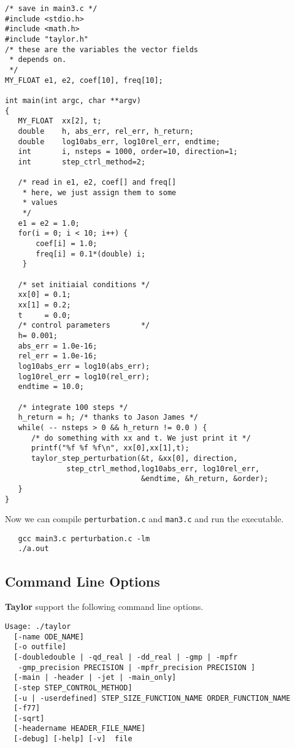 \documentclass{article}
\begin{document}
\begin{verbatim}
/* save in main3.c */
#include <stdio.h>
#include <math.h>
#include "taylor.h"
/* these are the variables the vector fields 
 * depends on.
 */
MY_FLOAT e1, e2, coef[10], freq[10];

int main(int argc, char **argv)
{
   MY_FLOAT  xx[2], t;
   double    h, abs_err, rel_err, h_return;
   double    log10abs_err, log10rel_err, endtime;
   int       i, nsteps = 1000, order=10, direction=1;
   int       step_ctrl_method=2;

   /* read in e1, e2, coef[] and freq[] 
    * here, we just assign them to some
    * values 
    */
   e1 = e2 = 1.0;
   for(i = 0; i < 10; i++) { 
       coef[i] = 1.0;
       freq[i] = 0.1*(double) i;
    }

   /* set initiaial conditions */
   xx[0] = 0.1;
   xx[1] = 0.2;
   t     = 0.0;
   /* control parameters       */
   h= 0.001;
   abs_err = 1.0e-16;
   rel_err = 1.0e-16;
   log10abs_err = log10(abs_err); 
   log10rel_err = log10(rel_err); 
   endtime = 10.0;

   /* integrate 100 steps */
   h_return = h; /* thanks to Jason James */
   while( -- nsteps > 0 && h_return != 0.0 ) {
      /* do something with xx and t. We just print it */
      printf("%f %f %f\n", xx[0],xx[1],t);
      taylor_step_perturbation(&t, &xx[0], direction,
              step_ctrl_method,log10abs_err, log10rel_err, 
                               &endtime, &h_return, &order);
   }
}

\end{verbatim}
\noindent
Now we can compile \verb+perturbation.c+ and \verb+man3.c+
and run the executable.
\begin{verbatim}
   gcc main3.c perturbation.c -lm
   ./a.out
\end{verbatim}


\subsection{Command Line Options}\label{sec:clo}

{\bf Taylor} support the following command line options.

\begin{verbatim}
Usage: ./taylor 
  [-name ODE_NAME]
  [-o outfile] 
  [-doubledouble | -qd_real | -dd_real | -gmp | -mpfr
   -gmp_precision PRECISION | -mpfr_precision PRECISION ]
  [-main | -header | -jet | -main_only] 
  [-step STEP_CONTROL_METHOD]
  [-u | -userdefined] STEP_SIZE_FUNCTION_NAME ORDER_FUNCTION_NAME 
  [-f77]
  [-sqrt]
  [-headername HEADER_FILE_NAME]
  [-debug] [-help] [-v]  file
\end{verbatim}
\end{document}
